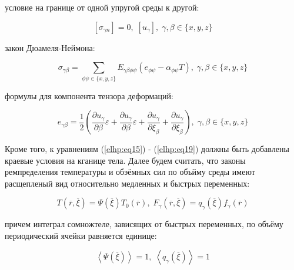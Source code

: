 условие на границе от одной упругой среды к другой:

\begin{equation}
    \label{elhp:eq17}
    \left[ \sigma_{\gamma n} \right] = 0, \; \left[ u_{\gamma} \right], \; \gamma,\beta \in \{x,y,z\} 
\end{equation}

закон Дюамеля-Неймона:

\begin{equation}
    \label{elhp:eq18}
    \sigma_{\gamma\beta} = \sum_{ \phi\psi \in \{x,y,z\} }
    E_{\gamma\beta\phi\psi} 
    \left( e_{\phi\psi} - \alpha_{\phi\psi}T \right) 
    , \;
    \gamma,\beta \in \{x,y,z\} 
\end{equation}

формулы для компонента тензора деформаций:

\begin{equation}
    \label{elhp:eq19}
    e_{\gamma\beta} = \frac{1}{2}
    \left( 
        \frac{\partial u_{\gamma}}{\partial \beta} \varepsilon +
        \frac{\partial u_{\gamma}}{\partial \beta} \varepsilon +
        \frac{\partial u_{\gamma}}{\partial \xi_{\beta}} +
        \frac{\partial u_{\gamma}}{\partial \xi_{\beta}}
    \right) 
    , \;
    \gamma,\beta \in \{x,y,z\} 
\end{equation}

Кроме того, к уравнениям 
(\ref{elhp:eq15})
-
(\ref{elhp:eq19})
должны быть добавлены краевые условия на кганице тела.
Далее будем считать, что законы ремпределения температуры и обэёмных сил по объйму среды имеют расщепленый вид относительно  медленных и быстрых
переменных:

\begin{equation}
    \label{elhp:eq20}
    T \left( \overline{r}, \overline{\xi} \right) = \Psi \left( \overline{\xi}  \right) T_0 \left( \overline{r}  \right) 
    , \;
    F_{\gamma} \left( \overline{r}, \overline{\xi} \right) = q_{\gamma} \left( \overline{\xi}  \right) f_{\gamma} \left( \overline{r}  \right) 
\end{equation}

причем интеграл сомножтеле, зависящих от быстрых переменных, по объёму периодический ячейки равняется единице:

\begin{equation}
    \label{elhp:eq21}
    \left< \Psi \left( \overline{\xi}  \right)  \right> = 1
    ,\;
    \left< q_{\gamma} \left( \overline{\xi}  \right)  \right> = 1
\end{equation}

